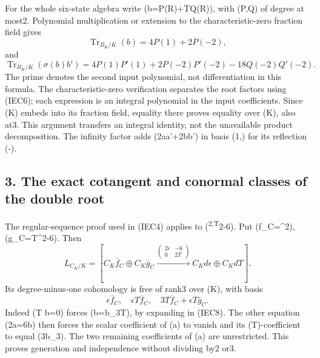\documentclass[
  10pt,
]{article}
\begin{document}
For the whole six-state algebra write (b=P(R)+TQ(R)), with (P,Q) of
degree at most2. Polynomial multiplication or extension to the
characteristic-zero fraction field gives \[
\operatorname{Tr}_{B_K/K}(b)=4P(1)+2P(-2),
\tag{IEC14}
\] and \[
\operatorname{Tr}_{B_K/K}(\sigma(b)b')
=4P(1)P'(1)+2P(-2)P'(-2)-18Q(-2)Q'(-2).
\tag{IEC15}
\] The prime denotes the second input polynomial, not differentiation in
this formula. The characteristic-zero verification separates the root
factors using (IEC6); each expression is an integral polynomial in the
input coefficients. Since (K) embeds into its fraction field, equality
there proves equality over (K), also at3. This argument transfers an
integral identity, not the unavailable product decomposition. The
infinity factor adds (2aa'+2bb') in basis (1,\Theta) for its reflection
(\Theta\mapsto-\Theta).

\subsection{3. The exact cotangent and conormal classes of the double
root}\label{the-exact-cotangent-and-conormal-classes-of-the-double-root}

The regular-sequence proof used in (IEC4) applies to
(\epsilon\textsuperscript{2,T}2-6\epsilon). Put (f\_C=\epsilon\^{}2),
(g\_C=T\^{}2-6\epsilon). Then \[
L_{C_K/K}=\left[C_K\bar f_C\oplus C_K\bar g_C
\xrightarrow{\left(\begin{smallmatrix}2\epsilon&-6\\0&2T\end{smallmatrix}\right)}
C_Kd\epsilon\oplus C_KdT\right].
\tag{IEC16}
\] Its degree-minus-one cohomology is free of rank3 over (K), with basis
\[
\epsilon\bar f_C,\quad \epsilon T\bar f_C,\quad
3T\bar f_C+\epsilon T\bar g_C.
\tag{IEC17}
\] Indeed (T b=0) forces (b=b\_3\epsilon T), by expanding in (IEC8). The
other equation (2\epsilon a=6b) then forces the scalar coefficient of
(a) to vanish and its (T)-coefficient to equal (3b\_3). The two
remaining coefficients of (a) are unrestricted. This proves generation
and independence without dividing by2 or3.
\end{document}
